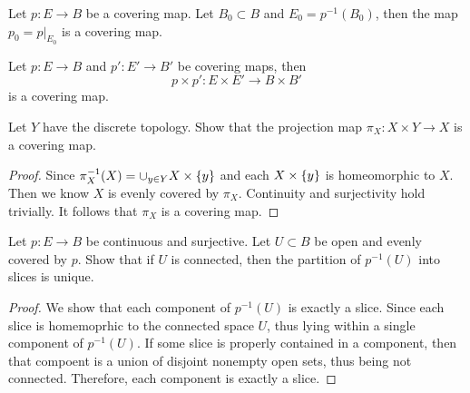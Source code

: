 \documentclass[12pt,a4paper]{article}
\begin{document}
    \begin{thm}
        Let $p:E\to B$ be a covering map. Let $B_0\subset B$ and $E_0=p^{-1}(B_0)$, then the map $p_0=p|_{E_0}$ is a covering map.
    \end{thm}
    \bigskip

    \begin{thm}
        Let $p:E\to B$ and $p':E'\to B'$ be covering maps, then
        \[
            p\times p':E\times E'\to B\times B'
        \]
        is a covering map.
    \end{thm}
    \bigskip

    \begin{ex}
        Let $Y$ have the discrete topology. Show that the projection map $\pi_X:X\times Y\to X$ is a covering map.
    \end{ex}
    \begin{proof}
        Since $\pi_X^{-1}(X)=\cup_{y\in Y}X\times\left\{ y \right\}$ and each $X\times\left\{ y \right\}$ is homeomorphic to $X$. Then we know $X$ is evenly covered by $\pi_X$. Continuity and surjectivity hold trivially. It follows that $\pi_X$ is a covering map.
    \end{proof}
    \bigskip

    \begin{ex}
        Let $p:E\to B$ be continuous and surjective. Let $U\subset B$ be open and evenly covered by $p$. Show that if $U$ is connected, then the partition of $p^{-1}(U)$ into slices is unique.
    \end{ex}
    \begin{proof}
        We show that each component of $p^{-1}(U)$ is exactly a slice. Since each slice is homemoprhic to the connected space $U$, thus lying within a single component of $p^{-1}(U)$. If some slice is properly contained in a component, then that compoent is a union of disjoint nonempty open sets, thus being not connected. Therefore, each component is exactly a slice. 
    \end{proof}
    \bigskip
\end{document}
